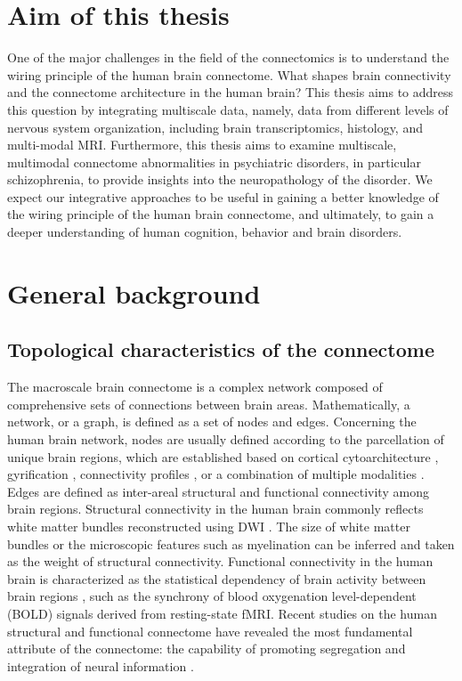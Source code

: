 \begin{refsection}
\section*{Aim of this thesis}
One of the major challenges in the field of the connectomics is to understand the wiring principle of the human brain connectome. What shapes brain connectivity and the connectome architecture in the human brain? This thesis aims to address this question by integrating multiscale data, namely, data from different levels of nervous system organization, including brain transcriptomics, histology, and multi-modal MRI. Furthermore, this thesis aims to examine multiscale, multimodal connectome abnormalities in psychiatric disorders, in particular schizophrenia, to provide insights into the neuropathology of the disorder. We expect our integrative approaches to be useful in gaining a better knowledge of the wiring principle of the human brain connectome, and ultimately, to gain a deeper understanding of human cognition, behavior and brain disorders.

\section*{General background}
\subsection*{Topological characteristics of the connectome}
The macroscale brain connectome is a complex network composed of comprehensive sets of connections between brain areas. Mathematically, a network, or a graph, is defined as a set of nodes and edges. Concerning the human brain network, nodes are usually defined according to the parcellation of unique brain regions, which are established based on cortical cytoarchitecture \citep{brodmann1909vergleichende}, gyrification \citep{DESIKAN2006968}, connectivity profiles \citep{Fan2016TheHB}, or a combination of multiple modalities \citep{Glasser2016AMP}. Edges are defined as inter-areal structural and functional connectivity among brain regions. Structural connectivity in the human brain commonly reflects white matter bundles reconstructed using DWI \citep{Hagmann2008MappingTS}. The size of white matter bundles or the microscopic features such as myelination can be inferred and taken as the weight of structural connectivity. Functional connectivity in the human brain is characterized as the statistical dependency of brain activity between brain regions \citep{Friston2011FunctionalAE}, such as the synchrony of blood oxygenation level-dependent (BOLD) signals derived from resting-state fMRI. Recent studies on the human structural and functional connectome have revealed the most fundamental attribute of the connectome: the capability of promoting segregation and integration of neural information \citep{Sporns2013NetworkAF}.


\end{refsection}
